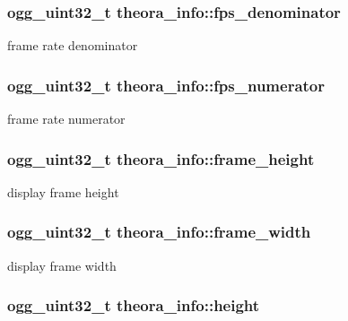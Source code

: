 \subsubsection[{fps\-\_\-denominator}]{\setlength{\rightskip}{0pt plus 5cm}ogg\-\_\-uint32\-\_\-t theora\-\_\-info\-::fps\-\_\-denominator}\label{structtheora__info_a9aa7e826e0323a4ae8cd8646a6cfbfea}


frame rate denominator 

\subsubsection[{fps\-\_\-numerator}]{\setlength{\rightskip}{0pt plus 5cm}ogg\-\_\-uint32\-\_\-t theora\-\_\-info\-::fps\-\_\-numerator}\label{structtheora__info_a3478199aa5ab213816c1819f70085ad7}


frame rate numerator 

\subsubsection[{frame\-\_\-height}]{\setlength{\rightskip}{0pt plus 5cm}ogg\-\_\-uint32\-\_\-t theora\-\_\-info\-::frame\-\_\-height}\label{structtheora__info_a287e4c194f1d2e6deb39d59f1748ea48}


display frame height 

\subsubsection[{frame\-\_\-width}]{\setlength{\rightskip}{0pt plus 5cm}ogg\-\_\-uint32\-\_\-t theora\-\_\-info\-::frame\-\_\-width}\label{structtheora__info_a8f28f4018a25634d40e4ae861fbbccfa}


display frame width 

\subsubsection[{height}]{\setlength{\rightskip}{0pt plus 5cm}ogg\-\_\-uint32\-\_\-t theora\-\_\-info\-::height}\label{structtheora__info_ae6f0274fc4a7f285c422d91abb35f9c6}


